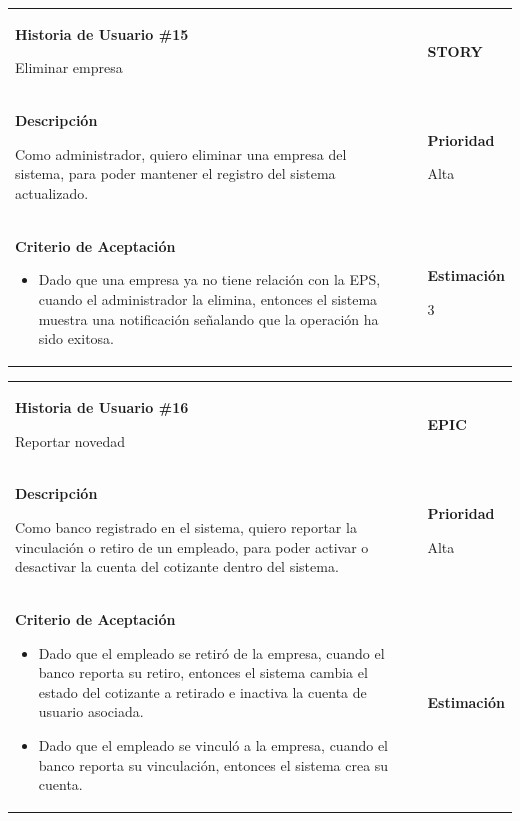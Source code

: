 \documentclass[12pt,a4paper]{article}
\begin{document}
\begin{center}
\begin{tabular}{| p{10cm} c p{2.5cm}|}
\hline 
\textbf{Historia de Usuario \#15}

Eliminar empresa & & \textbf{{\Large STORY}} \\ 
\textbf{Descripción}

Como administrador, quiero eliminar una empresa del sistema, para
poder mantener el registro del sistema actualizado. &  & \textbf{Prioridad}

Alta\\

\textbf{Criterio de Aceptación}

\begin{itemize}
\item Dado que una empresa ya no tiene relación con la EPS, cuando el
administrador la elimina, entonces el sistema muestra una
notificación señalando que la operación ha sido exitosa.
\end{itemize} & & \textbf{Estimación}

3 \\ 
\hline 
\end{tabular}
\vspace{5mm}

\begin{tabular}{|>{\columncolor[RGB]{215, 215, 215}} p{10cm} >{\columncolor[RGB]{215, 215, 215}} c >{\columncolor[RGB]{215, 215, 215}} p{2.5cm}|}
\hline 
\textbf{Historia de Usuario \#16}

Reportar novedad & & \textbf{{\Large EPIC}} \\ 
\textbf{Descripción}

Como banco registrado en el sistema, quiero reportar la vinculación o
retiro de un empleado, para poder activar o desactivar la cuenta del
cotizante dentro del sistema. &  & \textbf{Prioridad}

Alta\\

\textbf{Criterio de Aceptación}

\begin{itemize}
\item Dado que el empleado se retiró de la empresa, cuando el banco
reporta su retiro, entonces el sistema cambia el estado del
cotizante a retirado e inactiva la cuenta de usuario asociada.
\item Dado que el empleado se vinculó a la empresa, cuando el banco
reporta su vinculación, entonces el sistema crea su cuenta.
\end{itemize} & & \textbf{Estimación}


\end{tabular}
\end{center}
\end{document}
